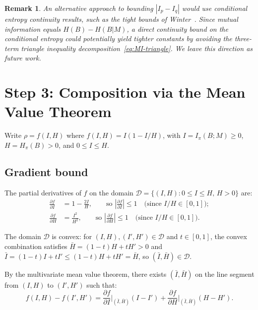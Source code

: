 \documentclass[11pt,a4paper]{article}
\newtheorem{remark}[theorem]{Remark}
\begin{document}
\begin{remark}
An alternative approach to bounding $|I_p - I_q|$ would use conditional
entropy continuity results, such as the tight bounds of
Winter~\cite{Winter2016}.  Since mutual information equals $H(B) - H(B|M)$,
a direct continuity bound on the conditional entropy could potentially
yield tighter constants by avoiding the three-term triangle inequality
decomposition~\eqref{eq:MI-triangle}.  We leave this direction as future
work.
\end{remark}


\section{Step 3: Composition via the Mean Value Theorem}\label{sec:step3}

Write $\rho = f(I, H)$ where $f(I, H) = I(1 - I/H)$, with
$I = I_\pi(B;M) \ge 0$, $H = H_\pi(B) > 0$, and $0 \le I \le H$.

\subsection{Gradient bound}

The partial derivatives of $f$ on the domain
$\mathcal{D} = \{(I,H) : 0 \le I \le H,\, H > 0\}$ are:
\begin{align}
  \frac{\partial f}{\partial I} &= 1 - \frac{2I}{H},
  \qquad\text{so } \left|\frac{\partial f}{\partial I}\right| \le 1
  \quad\text{(since $I/H \in [0,1]$)}; \label{eq:df-dI}\\[4pt]
  \frac{\partial f}{\partial H} &= \frac{I^2}{H^2},
  \qquad\text{so } \left|\frac{\partial f}{\partial H}\right| \le 1
  \quad\text{(since $I/H \in [0,1]$)}. \label{eq:df-dH}
\end{align}

The domain $\mathcal{D}$ is convex: for $(I,H), (I',H') \in \mathcal{D}$
and $t \in [0,1]$, the convex combination satisfies
$\bar{H} = (1-t)H + tH' > 0$ and
$\bar{I} = (1-t)I + tI' \le (1-t)H + tH' = \bar{H}$, so
$(\bar{I},\bar{H}) \in \mathcal{D}$.

By the multivariate mean value theorem, there exists
$(\bar{I},\bar{H})$ on the line segment from $(I,H)$ to $(I',H')$
such that:
\begin{equation}\label{eq:mvt-exact}
  f(I,H) - f(I',H') = \frac{\partial f}{\partial I}\bigg|_{(\bar{I},\bar{H})}
  (I - I') + \frac{\partial f}{\partial H}\bigg|_{(\bar{I},\bar{H})}(H - H').
\end{equation}
\end{document}
